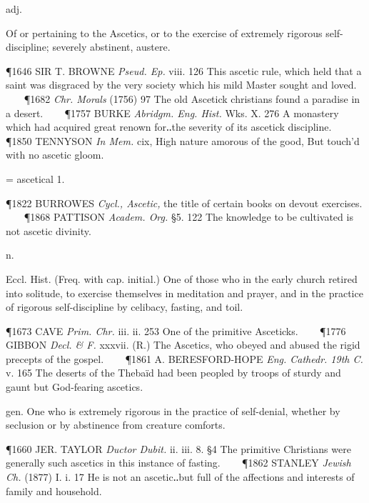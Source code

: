 \begin{description}[wide, labelwidth=!, labelindent=0pt]
\vspace{-0.3cm}

\begin{myenumerate}

 adj.

 Of or pertaining to the Ascetics, or to the exercise of extremely rigorous self-discipline; severely abstinent, austere.

\P 1646 SIR T. BROWNE  \textit{Pseud. Ep.} viii. 126 This ascetic rule, which held that a saint was disgraced by the very society which his mild Master sought and loved.    
\P 1682 \textit{Chr. Morals} (1756) 97 The old Ascetick christians found a paradise in a desert.    
\P 1757 BURKE  \textit{Abridgm. Eng. Hist.} Wks. X. 276 A monastery which had acquired great renown for‥the severity of its ascetick discipline.    
\P 1850 TENNYSON \textit{In Mem.} cix, High nature amorous of the good, But touch'd with no ascetic gloom.

 = ascetical 1.

\P 1822 BURROWES  \textit{Cycl., Ascetic,} the title of certain books on devout exercises.    
\P 1868 PATTISON  \textit{Academ. Org.} §5. 122 The knowledge to be cultivated is not ascetic divinity.

 n.

 Eccl. Hist. (Freq. with cap. initial.) One of those who in the early church retired into solitude, to exercise themselves in meditation and prayer, and in the practice of rigorous self-discipline by celibacy, fasting, and toil.

\P 1673 CAVE  \textit{Prim. Chr.} iii. ii. 253 One of the primitive Asceticks.    
\P 1776 GIBBON  \textit{Decl. \& F.} xxxvii. (R.) The Ascetics, who obeyed and abused the rigid precepts of the gospel.    
\P 1861 A. BERESFORD-HOPE  \textit{Eng. Cathedr. 19th C.} v. 165 The deserts of the Thebaïd had been peopled by troops of sturdy and gaunt but God-fearing ascetics.

 gen. One who is extremely rigorous in the practice of self-denial, whether by seclusion or by abstinence from creature comforts.

\P 1660 JER. TAYLOR  \textit{Ductor Dubit.} ii. iii. 8. §4 The primitive Christians were generally such ascetics in this instance of fasting.    
\P 1862 STANLEY  \textit{Jewish Ch.} (1877) I. i. 17 He is not an ascetic‥but full of the affections and interests of family and household.


\end{myenumerate}
\end{description}
